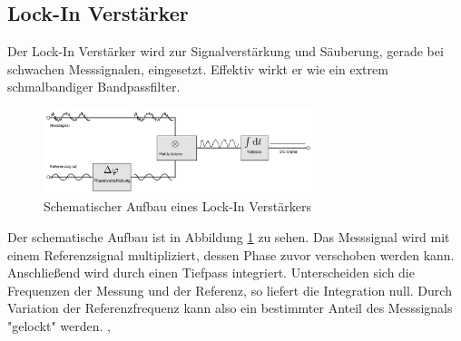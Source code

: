 		\subsection{Lock-In Verstärker}
Der Lock-In Verstärker wird zur Signalverstärkung und Säuberung, gerade bei 
schwachen Messsignalen, eingesetzt. Effektiv wirkt er wie ein extrem schmalbandiger
Bandpassfilter.
\begin{figure}[h]
	\centering
	\includegraphics[width=0.7\textwidth]{Abb/lockin.pdf}
	\caption{Schematischer Aufbau eines Lock-In Verstärkers \cite{lockinwiki}}
	\label{Abb:lockin}
\end{figure}
Der schematische Aufbau ist in Abbildung \ref{Abb:lockin} zu sehen. Das Messsignal
wird mit einem Referenzsignal multipliziert, dessen Phase zuvor verschoben werden 
kann. Anschließend wird durch einen Tiefpass integriert. Unterscheiden sich die 
Frequenzen der Messung und der Referenz, so liefert die Integration null. Durch
Variation der Referenzfrequenz kann also ein bestimmter Anteil des Messsignals
"gelockt" werden. \cite{lockinwiki}, \cite{kreuzwiki}
